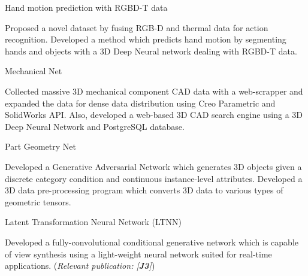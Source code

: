 


\begin{cventries}
\cvpub
{Hand motion prediction with RGBD-T data} %
{ %
\begin{cvitems}
\item {Proposed a novel dataset by fusing RGB-D and thermal data for action recognition. Developed a method which predicts hand motion by segmenting hands and objects with a 3D Deep Neural network dealing with RGBD-T data.}
\end{cvitems}
}

\cvpub
{Mechanical Net} %
{ %
\begin{cvitems}
\item {Collected massive 3D mechanical component CAD data with a web-scrapper and expanded the data for dense data distribution using Creo Parametric and SolidWorks API. Also, developed a web-based 3D CAD search engine using a 3D Deep Neural Network and PostgreSQL database.}
\end{cvitems}
}

\cvpub
{Part Geometry Net} %
{ %
\begin{cvitems}
\item {Developed a Generative Adversarial Network which generates 3D objects given a discrete category condition and continuous instance-level attributes. Developed a 3D data pre-processing program which converts 3D data to various types of geometric tensors.}
\end{cvitems}
}


\cvpub
{Latent Transformation Neural Network (LTNN)} %
{ %
\begin{cvitems}
\item {Developed a fully-convolutional conditional generative network which is capable of view synthesis using a light-weight neural network suited for real-time applications. (\textit{Relevant publication: [\textbf{J3}]})}
\end{cvitems}
}


\end{cventries}
